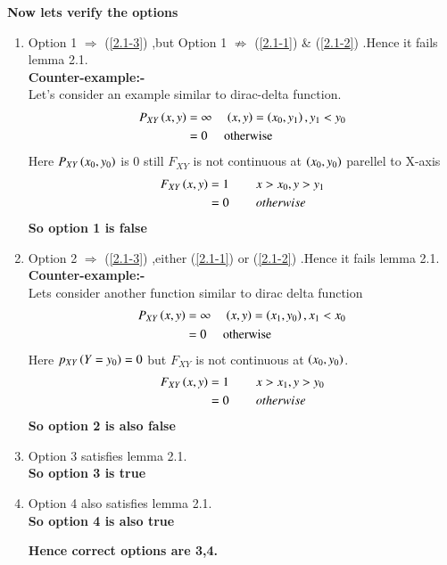 \documentclass[journal,12pt,twocolumn]{IEEEtran}
\begin{document}
\textbf{Now lets verify the options}
\begin{enumerate}
\item Option 1 $\Rightarrow$ (\ref{2.1-3}) ,but Option 1 $\not \Rightarrow$ (\ref{2.1-1}) \& (\ref{2.1-2}) .Hence it fails lemma 2.1.\\
\textbf{Counter-example:-}\\
Let's consider an example similar to dirac-delta function.
\begin{align}
P_{XY}\left(x,y\right)&=\infty \hspace{0.15in} \left(x,y\right)=\left(x_0,y_1\right) , y_1<y_0  \nonumber \\
&=0 \hspace{0.15in} \text{ otherwise}
\end{align}
Here $P_{XY}\left(x_0,y_0\right)$ is 0 still $F_{XY}$ is not continuous at $\left(x_0,y_0\right)$ parellel to X-axis
\begin{align}
F_{XY}\left(x,y\right)&=1 \hspace{0.3in} x>x_0,y>y_1 \nonumber\\
&=0 \hspace{0.3in} otherwise
\end{align}
\textbf{So option 1 is false}
\item Option 2 $\Rightarrow$ (\ref{2.1-3}) ,either (\ref{2.1-1}) or (\ref{2.1-2}) .Hence it fails lemma 2.1.\\
\textbf{Counter-example:-}\\
Lets consider another function similar to dirac delta function
\begin{align}
P_{XY}\left(x,y\right)&=\infty \hspace{0.15in} \left(x,y\right)=\left(x_1,y_0\right) , x_1<x_0  \nonumber \\
&=0 \hspace{0.15in} \text{ otherwise}
\end{align}
Here $p_{XY}\left(Y=y_0\right)=0$ but $F_{XY}$ is not continuous at $\left(x_0,y_0\right)$.
\begin{align}
F_{XY}\left(x,y\right)&=1 \hspace{0.3in} x>x_1,y>y_0 \nonumber\\
&=0 \hspace{0.3in} otherwise
\end{align}
\textbf{So option 2 is also false}
\item Option 3 satisfies lemma 2.1.\\
\textbf{So option 3 is true}
\item Option 4 also satisfies lemma 2.1.\\
\textbf{So option 4 is also true}
\begin{center}
\textbf{Hence correct options are 3,4.}
\end{center}
\end{enumerate}
\end{document}
